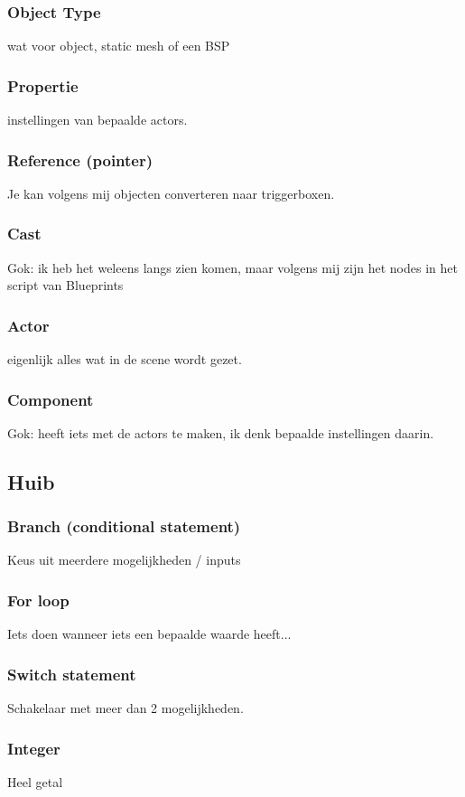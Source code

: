 \subsubsection*{Object Type}
wat voor object, static mesh of een BSP
\subsubsection*{Propertie}
instellingen van bepaalde actors.
\subsubsection*{Reference (pointer)}
Je kan volgens mij objecten converteren naar triggerboxen.
\subsubsection*{Cast}
Gok: ik heb het weleens langs zien komen, maar volgens mij zijn het nodes in het script van Blueprints
\subsubsection*{Actor}
eigenlijk alles wat in de scene wordt gezet.
\subsubsection*{Component}
Gok: heeft iets met de actors te maken, ik denk bepaalde instellingen daarin.

\subsection*{Huib}
\subsubsection*{Branch (conditional statement)}
Keus uit meerdere mogelijkheden / inputs
\subsubsection*{For loop}
Iets doen wanneer iets een bepaalde waarde heeft...
\subsubsection*{Switch statement}
Schakelaar met meer dan 2 mogelijkheden.
\subsubsection*{Integer}
Heel getal
